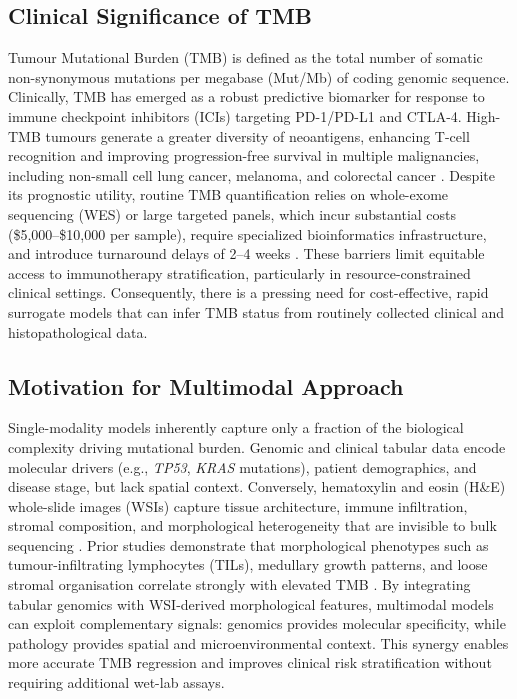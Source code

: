 \documentclass[11pt,a4paper]{article}
\begin{document}
\subsection{Clinical Significance of TMB}
Tumour Mutational Burden (TMB) is defined as the total number of somatic non-synonymous mutations per megabase (Mut/Mb) of coding genomic sequence. Clinically, TMB has emerged as a robust predictive biomarker for response to immune checkpoint inhibitors (ICIs) targeting PD-1/PD-L1 and CTLA-4. High-TMB tumours generate a greater diversity of neoantigens, enhancing T-cell recognition and improving progression-free survival in multiple malignancies, including non-small cell lung cancer, melanoma, and colorectal cancer \cite{shimada2021, huang2022}. Despite its prognostic utility, routine TMB quantification relies on whole-exome sequencing (WES) or large targeted panels, which incur substantial costs (\$5,000--\$10,000 per sample), require specialized bioinformatics infrastructure, and introduce turnaround delays of 2--4 weeks \cite{huang2022}. These barriers limit equitable access to immunotherapy stratification, particularly in resource-constrained clinical settings. Consequently, there is a pressing need for cost-effective, rapid surrogate models that can infer TMB status from routinely collected clinical and histopathological data.

\subsection{Motivation for Multimodal Approach}
Single-modality models inherently capture only a fraction of the biological complexity driving mutational burden. Genomic and clinical tabular data encode molecular drivers (e.g., \textit{TP53}, \textit{KRAS} mutations), patient demographics, and disease stage, but lack spatial context. Conversely, hematoxylin and eosin (H\&E) whole-slide images (WSIs) capture tissue architecture, immune infiltration, stromal composition, and morphological heterogeneity that are invisible to bulk sequencing \cite{xu2024cellmorphnet}. Prior studies demonstrate that morphological phenotypes such as tumour-infiltrating lymphocytes (TILs), medullary growth patterns, and loose stromal organisation correlate strongly with elevated TMB \cite{shimada2021}. By integrating tabular genomics with WSI-derived morphological features, multimodal models can exploit complementary signals: genomics provides molecular specificity, while pathology provides spatial and microenvironmental context. This synergy enables more accurate TMB regression and improves clinical risk stratification without requiring additional wet-lab assays.
\end{document}
